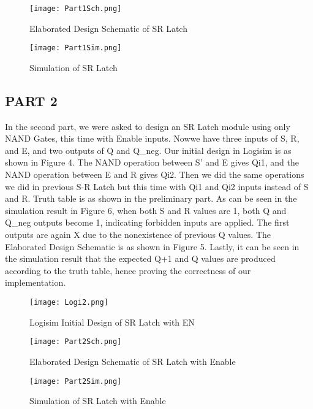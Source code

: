 \documentclass[pdftex,12pt,a4paper]{article}
\begin{document}
\begin{figure}[ht]
	\centering
	\texttt{[image: Part1Sch.png]}
	\caption{Elaborated Design Schematic of SR Latch }
	\label{fig1}
\end{figure}

\begin{figure}[ht]
	\centering
	\texttt{[image: Part1Sim.png]}
	\caption{Simulation of SR Latch}
	\label{fig1}
\end{figure}

\subsection{PART 2}
In the second part, we were asked to design an SR Latch module using only NAND Gates, this time with Enable inputs. Nowwe have three inputs of S, R, and E, and two outputs of Q and Q\_neg. Our initial design in Logisim is as shown in Figure 4. The NAND operation between S' and E gives Qi1, and the NAND operation between E and R gives Qi2. Then we did the same operations we did in previous S-R Latch but this time with Qi1 and Qi2 inputs instead of S and R. Truth table is as shown in the preliminary part. As can be seen in the simulation result in Figure 6, when both S and R values are 1, both Q and Q\_neg outputs become 1, indicating forbidden inputs are applied. The first outputs are again X due to the nonexistence of previous Q values. The Elaborated Design Schematic is as shown in Figure 5. Lastly, it can be seen in the simulation result that the expected Q+1 and Q values are produced according to the truth table, hence proving the correctness of our implementation.



\begin{figure}[ht]
	\centering
	\texttt{[image: Logi2.png]}
	\caption{Logisim Initial Design of SR Latch with EN}
	\label{fig1}
\end{figure}

\begin{figure}[ht]
	\centering
	\texttt{[image: Part2Sch.png]}
	\caption{Elaborated Design Schematic of SR Latch with Enable}
	\label{fig1}
\end{figure}

\begin{figure}[ht]
	\centering
	\texttt{[image: Part2Sim.png]}
	\caption{Simulation of SR Latch with Enable}
	\label{fig1}
\end{figure}
\end{document}
